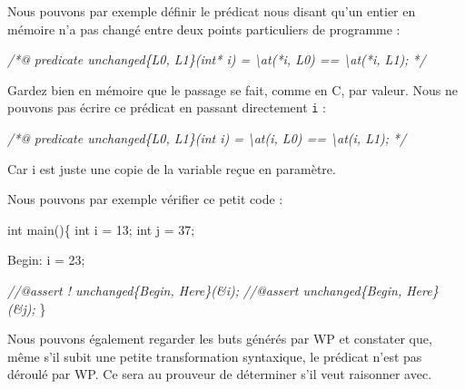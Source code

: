 \documentclass[12pt,francais,]{scrbook}
\newenvironment{Shaded}{}{}
\newcommand{\DataTypeTok}[1]{\textcolor[rgb]{0.56,0.13,0.00}{{#1}}}
\newcommand{\DecValTok}[1]{\textcolor[rgb]{0.25,0.63,0.44}{{#1}}}
\newcommand{\CommentTok}[1]{\textcolor[rgb]{0.38,0.63,0.69}{\textit{{#1}}}}
\newcommand{\CommentTokAlt}[1]{\textcolor[rgb]{0.18,0.33,0.39}{\textit{{#1}}}}
\newcommand{\NormalTok}[1]{{#1}}
\newenvironment{zdsalertblock}[1]{%
  \tcolorbox[beamer,%
    noparskip,breakable,
    colback=LightCoral,colframe=DarkRed,%
    colbacklower=Tomato,%
    title=#1]
}{\endtcolorbox}
\begin{document}
Nous pouvons par exemple définir le prédicat nous disant qu'un entier en
mémoire n'a pas changé entre deux points particuliers de programme :

\begin{footnotesize}\begin{Shaded}
\begin{Highlighting}[]
\CommentTok{/*@}
\CommentTok{  predicate unchanged\{L0, L1\}(int* i) =}
\CommentTok{    \textbackslash{}at(*i, L0) == \textbackslash{}at(*i, L1);}
\CommentTok{*/}
\end{Highlighting}
\end{Shaded}\end{footnotesize}

\begin{zdsalertblock}{Attention}
  Gardez bien en mémoire que le passage
  se fait, comme en C, par valeur. Nous ne pouvons pas écrire
  ce prédicat en passant directement \texttt{i} :
  \begin{footnotesize}\begin{Shaded}
    \begin{Highlighting}[]
\CommentTokAlt{/*@}
\CommentTokAlt{  predicate unchanged\{L0, L1\}(int i) =}
\CommentTokAlt{    \textbackslash{}at(i, L0) == \textbackslash{}at(i, L1);}
\CommentTokAlt{*/}
    \end{Highlighting}
  \end{Shaded}\end{footnotesize}
  Car i est juste une copie de la variable reçue en paramètre.
\end{zdsalertblock}
  
Nous pouvons par exemple vérifier ce petit code :

\begin{footnotesize}\begin{Shaded}
\begin{Highlighting}[]
\DataTypeTok{int} \NormalTok{main()\{}
  \DataTypeTok{int} \NormalTok{i = }\DecValTok{13}\NormalTok{;}
  \DataTypeTok{int} \NormalTok{j = }\DecValTok{37}\NormalTok{;}

 \NormalTok{Begin:}
  \NormalTok{i = }\DecValTok{23}\NormalTok{;}
 
  \CommentTok{//@assert ! unchanged\{Begin, Here\}(&i);}
  \CommentTok{//@assert   unchanged\{Begin, Here\}(&j);}
\NormalTok{\}}
\end{Highlighting}
\end{Shaded}\end{footnotesize}

Nous pouvons également regarder les buts générés par WP et constater
que, même s'il subit une petite transformation syntaxique, le prédicat
n'est pas déroulé par WP. Ce sera au prouveur de déterminer s'il veut
raisonner avec.
\end{document}
